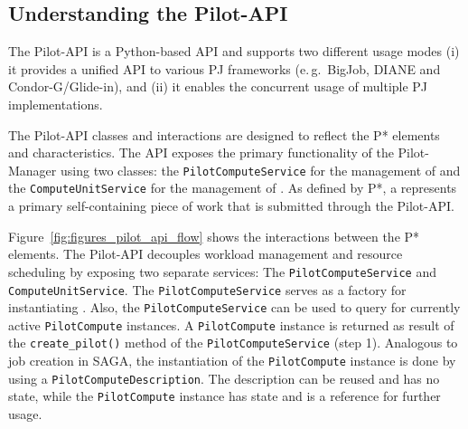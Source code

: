 \documentclass[conference]{IEEEtran}
\begin{document}

\subsection{Understanding the Pilot-API}



The Pilot-API is a Python-based API and supports two different usage modes (i)
it provides a unified API to various PJ frameworks (e.\,g.\ BigJob, DIANE and
Condor-G/Glide-in), and (ii) it enables the concurrent usage of multiple PJ
implementations.

The Pilot-API classes and interactions are designed to reflect the P*
elements and characteristics.
The API exposes the primary functionality of the Pilot-Manager using two
classes: the \texttt{Pilot\-Compute\-Service} for the management of \pilots
and the \texttt{Compute\-Unit\-Service} for the management of \cus. 
As defined by P*, a \cu represents a primary self-containing piece of work that
is submitted through the Pilot-API. 

Figure~\ref{fig:figures_pilot_api_flow} shows the interactions between the
P* elements.
The Pilot-API decouples workload management and resource scheduling by exposing
two separate services: The \texttt{Pilot\-Compute\-Service} and
\texttt{Compute\-Unit\-Service}. 
The \texttt{Pilot\-Compute\-Service} serves as a factory for instantiating \pilots. 
Also, the \texttt{Pilot\-Compute\-Service} can be used to query for currently
active \texttt{Pilot\-Compute} instan\-ces.
A \texttt{Pilot\-Compute} instance is returned as result of the
\texttt{create\_pilot()} method of the \texttt{Pi\-lot\-Compute\-Service} (step 1).
Analogous to job creation in SAGA, the instantiation of the
\texttt{Pilot\-Compute} instance is done by using a
\texttt{Pilot\-ComputeDescription}. The description can be reused and has no
state, while the \texttt{Pilot\-Compute} instance has state and is a reference
for further usage.\\
\end{document}
